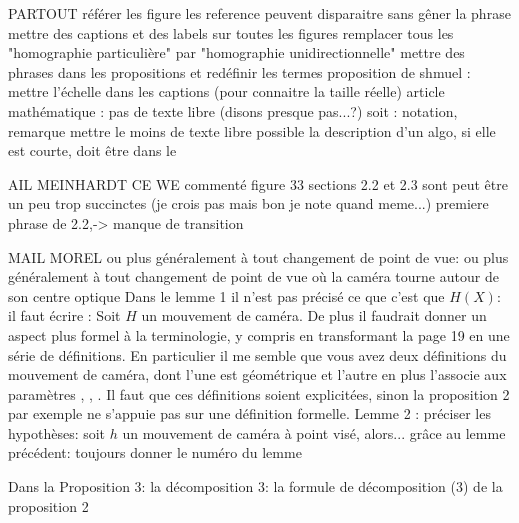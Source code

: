PARTOUT
	référer les figure
	les reference peuvent disparaitre sans gêner la phrase
	mettre des captions et des labels sur toutes les figures
	remplacer tous les "homographie particulière" par "homographie unidirectionnelle"
	mettre des phrases dans les propositions et redéfinir les termes
	proposition de shmuel : mettre l'échelle dans les captions (pour connaitre la taille réelle)
	article mathématique : pas de texte libre (disons presque pas...?)
		soit : notation, remarque
	mettre le moins de texte libre possible
	la description d'un algo, si elle est courte, doit être dans le \caption


MAIL MEINHARDT CE WE
	commenté figure 33
	sections 2.2 et 2.3 sont peut être un peu trop succinctes (je crois pas mais bon je note quand meme...) 
	premiere phrase de 2.2,-> manque de transition

MAIL MOREL
	ou plus généralement à tout changement de point de vue: ou plus généralement à tout changement de point de vue où la caméra tourne autour de son centre optique
	Dans le lemme 1 il n'est pas précisé ce que c'est que $H(X)$: il faut écrire : Soit $H$ un mouvement de caméra.
	De plus il faudrait donner un aspect plus formel à la terminologie, y compris en transformant la page 19 en une série de définitions. En particulier il me semble que vous avez deux définitions du mouvement de caméra, dont l'une est géométrique et l'autre en plus l'associe aux paramètres \theta, \phi, \psi. Il faut que ces définitions soient explicitées, sinon la proposition 2 par exemple ne s'appuie pas sur une définition formelle.
	Lemme 2 : préciser les hypothèses: soit $h$ un mouvement  de caméra à point visé, alors...
	grâce au lemme précédent: toujours donner le numéro du lemme
	
	Dans la Proposition 3: la décomposition 3: la formule de décomposition (3) de la proposition 2
